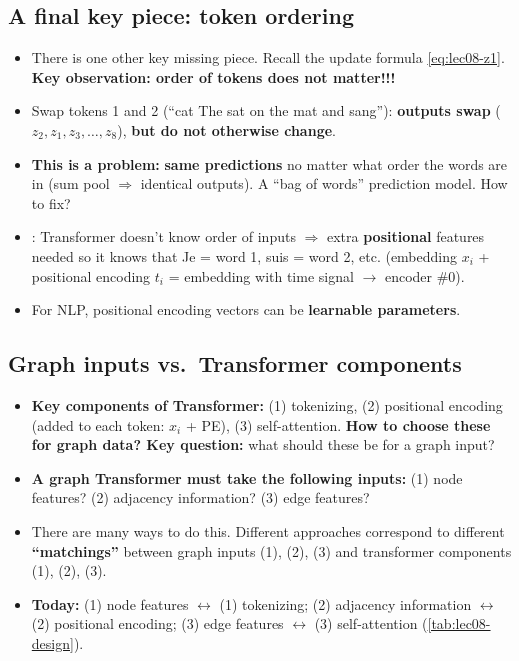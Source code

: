 \subsection{A final key piece: token ordering}\label{sec:lec08-order}

\begin{itemize}
  \item There is one other key missing piece. Recall the update formula
    \cref{eq:lec08-z1}. \textbf{Key observation: order of tokens does not
    matter!!!}
  \item Swap tokens 1 and 2 (``cat The sat on the mat and sang''): \textbf{outputs
    swap} ($z_2,z_1,z_3,\dots,z_8$), \textbf{but do not otherwise change}.
  \item \textbf{This is a problem:} \textbf{same predictions} no matter what
    order the words are in (sum pool $\Rightarrow$ identical outputs). A ``bag
    of words'' prediction model. How to fix?
  \item {}: Transformer doesn't know order of inputs
    $\Rightarrow$ extra \textbf{positional} features needed so it knows that
    Je = word 1, suis = word 2, etc. (embedding $x_i$ + positional encoding
    $t_i$ = embedding with time signal $\to$ encoder \#0).
  \item For NLP, positional encoding vectors can be \textbf{learnable parameters}.
\end{itemize}

\subsection{Graph inputs vs.\ Transformer components}\label{sec:lec08-match}

\begin{itemize}
  \item \textbf{Key components of Transformer:} (1) tokenizing, (2) positional
    encoding (added to each token: $x_i$ + PE), (3) self-attention. \textbf{How
    to choose these for graph data? Key question:} what should these be for a
    graph input?
  \item \textbf{A graph Transformer must take the following inputs:} (1) node
    features? (2) adjacency information? (3) edge features?
  \item There are many ways to do this. Different approaches correspond to
    different \textbf{``matchings''} between graph inputs (1), (2), (3) and
    transformer components (1), (2), (3).
  \item \textbf{Today:} (1) node features $\leftrightarrow$ (1) tokenizing;
    (2) adjacency information $\leftrightarrow$ (2) positional encoding;
    (3) edge features $\leftrightarrow$ (3) self-attention
    (\cref{tab:lec08-design}).
\end{itemize}

